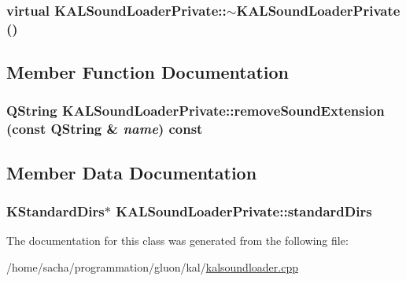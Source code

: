 \hypertarget{class_k_a_l_sound_loader_private_074bf63bb649f18038d9aa91ae022b63}{
\subsubsection[{$\sim$KALSoundLoaderPrivate}]{\setlength{\rightskip}{0pt plus 5cm}virtual KALSoundLoaderPrivate::$\sim$KALSoundLoaderPrivate ()}}
\label{class_k_a_l_sound_loader_private_074bf63bb649f18038d9aa91ae022b63}




\subsection{Member Function Documentation}
\hypertarget{class_k_a_l_sound_loader_private_b7fd073b080f828d48a975bba1f97dcf}{
\subsubsection[{removeSoundExtension}]{\setlength{\rightskip}{0pt plus 5cm}QString KALSoundLoaderPrivate::removeSoundExtension (const QString \& {\em name}) const}}
\label{class_k_a_l_sound_loader_private_b7fd073b080f828d48a975bba1f97dcf}




\subsection{Member Data Documentation}
\hypertarget{class_k_a_l_sound_loader_private_d03da18283e0ea80833e6ae669193014}{
\subsubsection[{standardDirs}]{\setlength{\rightskip}{0pt plus 5cm}KStandardDirs$\ast$ {\bf KALSoundLoaderPrivate::standardDirs}}}
\label{class_k_a_l_sound_loader_private_d03da18283e0ea80833e6ae669193014}




The documentation for this class was generated from the following file:\begin{CompactItemize}
\item 
/home/sacha/programmation/gluon/kal/\hyperlink{kalsoundloader_8cpp}{kalsoundloader.cpp}\end{CompactItemize}
